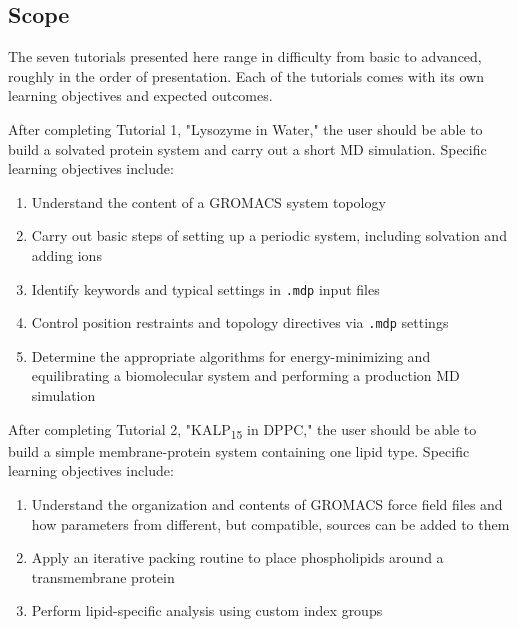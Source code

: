\documentclass[9pt,tutorial,pubversion]{livecoms}
\begin{document}
\subsection{Scope}



The seven tutorials presented here range in difficulty from basic to advanced, roughly in the order of presentation. Each of the tutorials comes with its own learning objectives and expected outcomes.

After completing Tutorial 1, "Lysozyme in Water," the user should be able to build a solvated protein system and carry out a short MD simulation. Specific learning objectives include:
\begin{enumerate}
	\item Understand the content of a GROMACS system topology
	\item Carry out basic steps of setting up a periodic system, including solvation and adding ions
	\item Identify keywords and typical settings in \texttt{.mdp} input files
	\item Control position restraints and topology directives via \texttt{.mdp} settings
	\item Determine the appropriate algorithms for energy-minimizing and equilibrating a biomolecular system and performing a production MD simulation
\end{enumerate}

After completing Tutorial 2, "KALP\textsubscript{15} in DPPC," the user should be able to build a simple membrane-protein system containing one lipid type. Specific learning objectives include:
\begin{enumerate}
	\item Understand the organization and contents of GROMACS force field files and how parameters from different, but compatible, sources can be added to them
	\item Apply an iterative packing routine to place phospholipids around a transmembrane protein
	\item Perform lipid-specific analysis using custom index groups
\end{enumerate}
\end{document}
